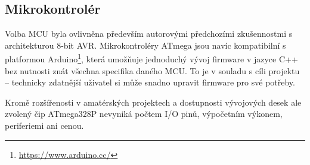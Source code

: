 \subsection{Mikrokontrolér}
Volba MCU byla ovlivněna především autorovými předchozími zkušennostmi
s architekturou 8-bit AVR. Mikrokontroléry ATmega jsou navíc kompatibilní
s platformou Arduino\footnote{\url{https://www.arduino.cc/}}, která umožňuje
jednoduchý vývoj firmware v jazyce C++ bez nutnosti znát všechna specifika
daného MCU. To je v souladu s cíli projektu -- technicky zdatnější uživatel si
může snadno upravit firmware pro své potřeby.

Kromě rozšířenosti v amatérských projektech a dostupnosti vývojových desek ale
zvolený čip ATmega328P nevyniká počtem I/O pinů, výpočetním výkonem,
periferiemi ani cenou.

\nocite{dshATmega328} %
